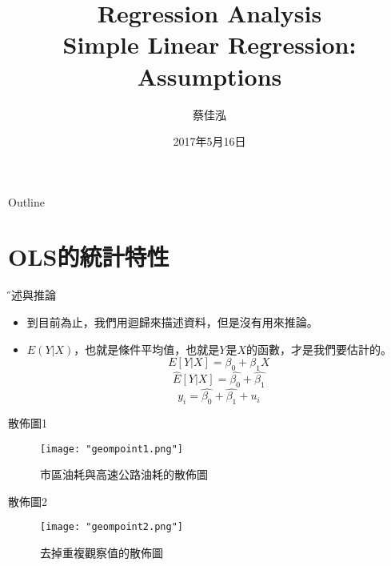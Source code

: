 \documentclass[xcolor=dvipsnames]{beamer}
\author[蔡佳泓]{\K 蔡佳泓}
\title[Statistical Methods for Social Sciences]{Regression Analysis\\
\smallskip
{\small {Simple Linear Regression: Assumptions}}}
\date[5/16/2017]{2017年5月16日} %
\institute[ESC \& GIEAS]{\H 國立政治大學選舉研究中心暨東亞研究所}
\begin{document}
\maketitle
\begin{frame}{Outline}
\tableofcontents
\end{frame}

\section{OLS的統計特性}
\begin{frame}{\H 描述與推論}

\begin{itemize}
\item 到目前為止，我們用迴歸來描述資料，但是沒有用來推論。
\item $ E(Y|X) $，也就是條件平均值，也就是$Y$是$X$的函數，才是我們要估計的。
\[E[Y|X]=\beta_{0}+\beta_{1}X\]
\[\hat{E}[Y|X]=\hat{\beta_{0}}+\hat{\beta_{1}}\]
\[y_{i}=\hat{\beta_{0}}+\hat{\beta_{1}}+u_{i}\]
\end{itemize}
\end{frame}
\begin{frame}{散佈圖1}
\begin{figure}
\texttt{[image: "geompoint1.png"]}
\caption{市區油耗與高速公路油耗的散佈圖}
\label{fig.1}
\end{figure}
\end{frame}
\begin{frame}{散佈圖2}
\begin{figure}
\texttt{[image: "geompoint2.png"]}
\caption{去掉重複觀察值的散佈圖}
\label{fig.2}
\end{figure}
\end{frame}
\end{document}
